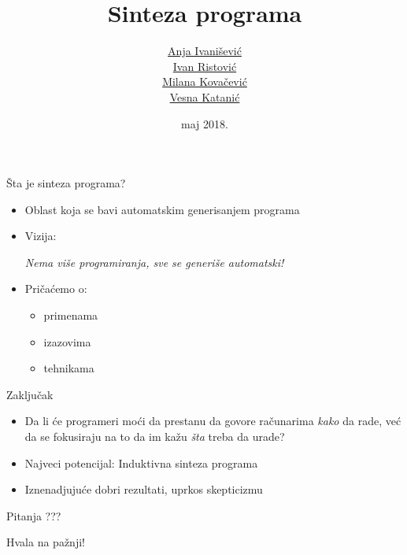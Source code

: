 \documentclass{beamer}
\title{Sinteza programa}
\author{\href{mailto:anja.ivanisevic95@gmail.com}{Anja Ivanišević}\\\href{mailto:mi14031@matf.bg.ac.rs}{Ivan Ristović}\\\href{mailto:mi14042@matf.bg.ac.rs}{Milana Kovačević}\\\href{mailto:vesna.katanic@gmail.com}{Vesna Katanić}}
\date{maj 2018.}
\begin{document}
\begin{frame}
    \titlepage
\end{frame}

\begin{frame}{\v{S}ta je sinteza programa?}
    \begin{itemize}
        \item Oblast koja se bavi automatskim generisanjem programa
        \item Vizija:\\
            \begin{center}
            \emph{Nema vi\v{s}e programiranja, sve se generi\v{s}e automatski!}
            \end{center}
        \item Pri\v{c}a\'{c}emo o:
        \begin{itemize}
            \item primenama
            \item izazovima
            \item tehnikama
        \end{itemize}
    \end{itemize}
\end{frame}








\begin{frame}{Zaključak}
    \centering
    \begin{itemize}
        \item Da li će programeri moći da prestanu da govore računarima \emph{kako} da rade, već da se fokusiraju na to da im kažu \emph{šta} treba da urade?
        \item Najveci potencijal: Induktivna sinteza programa
        \item Iznenadjuju\'c{}e dobri rezultati, uprkos skepticizmu
    \end{itemize}
\end{frame}

\begin{frame}{Pitanja}
    \centering
    ???
\end{frame}

\begin{frame}{}
    \centering
    Hvala na pažnji!
\end{frame}
\end{document}

